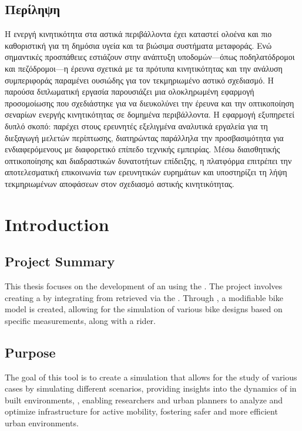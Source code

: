 \documentclass[letterpaper,10pt,english]{jupyterBook}
\begin{document}
\section{Περίληψη}
\label{\detokenize{Abstact:id1}}
\sphinxAtStartPar
Η ενεργή κινητικότητα στα αστικά περιβάλλοντα έχει καταστεί ολοένα και πιο καθοριστική για τη δημόσια υγεία και τα βιώσιμα συστήματα μεταφοράς. Ενώ σημαντικές προσπάθειες εστιάζουν στην ανάπτυξη υποδομών—όπως ποδηλατόδρομοι και πεζόδρομοι—η έρευνα σχετικά με τα πρότυπα κινητικότητας και την ανάλυση συμπεριφοράς παραμένει ουσιώδης για τον τεκμηριωμένο αστικό σχεδιασμό. Η παρούσα διπλωματική εργασία παρουσιάζει μια ολοκληρωμένη εφαρμογή προσομοίωσης που σχεδιάστηκε για να διευκολύνει την έρευνα και την οπτικοποίηση σεναρίων ενεργής κινητικότητας σε δομημένα περιβάλλοντα. Η εφαρμογή εξυπηρετεί δυπλό σκοπό: παρέχει στους ερευνητές εξελιγμένα αναλυτικά εργαλεία για τη διεξαγωγή μελετών περίπτωσης, διατηρώντας παράλληλα την προσβασιμότητα για ενδιαφερόμενους με διαφορετικό επίπεδο τεχνικής εμπειρίας. Μέσω διαισθητικής οπτικοποίησης και διαδραστικών δυνατοτήτων επίδειξης, η πλατφόρμα επιτρέπει την αποτελεσματική επικοινωνία των ερευνητικών ευρημάτων και υποστηρίζει τη λήψη τεκμηριωμένων αποφάσεων στον σχεδιασμό αστικής κινητικότητας.

\sphinxstepscope


\chapter{Introduction}
\label{\detokenize{Introduction:introduction}}\label{\detokenize{Introduction::doc}}

\section{Project Summary}
\label{\detokenize{Introduction:project-summary}}
\sphinxAtStartPar
This thesis focuses on the development of an  using the . The project involves creating a  by integrating  from  retrieved via the . Through , a modifiable bike model is created, allowing for the simulation of various bike designs based on specific measurements, along with a rider.


\section{Purpose}
\label{\detokenize{Introduction:purpose}}
\sphinxAtStartPar
The goal of this tool is to create a simulation that allows for the study of various cases by simulating different scenarios, providing insights into the dynamics of {\hyperref[\detokenize{glossary:active-mobility}]{}} in built environments, , enabling researchers and urban planners to analyze and optimize infrastructure for active mobility, fostering safer and more efficient urban environments.
\end{document}
